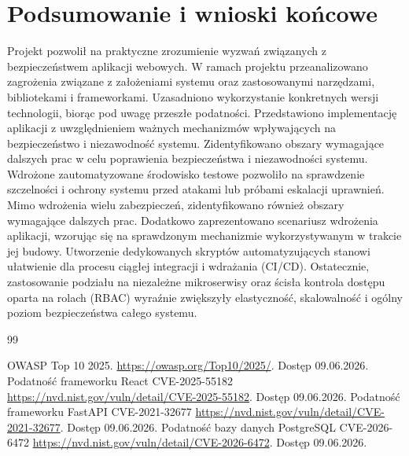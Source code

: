 \documentclass[12pt,twoside]{article}
\begin{document}
\section{Podsumowanie i wnioski końcowe}
Projekt pozwolił na praktyczne zrozumienie wyzwań związanych z bezpieczeństwem aplikacji webowych. W ramach projektu przeanalizowano zagrożenia związane z założeniami systemu oraz zastosowanymi narzędzami, bibliotekami i frameworkami. Uzasadniono wykorzystanie konkretnych wersji technologii, biorąc pod uwagę przeszłe podatności. Przedstawiono implementację aplikacji z uwzględnieniem ważnych mechanizmów wpływających na bezpieczeństwo i niezawodność systemu. Zidentyfikowano obszary wymagające dalszych prac w celu poprawienia bezpieczeństwa i niezawodności systemu. Wdrożone zautomatyzowane środowisko testowe pozwoliło na sprawdzenie szczelności i ochrony systemu przed atakami lub próbami eskalacji uprawnień. Mimo wdrożenia wielu zabezpieczeń, zidentyfikowano również obszary wymagające dalszych prac.
Dodatkowo zaprezentowano scenariusz wdrożenia aplikacji, wzorując się na sprawdzonym mechanizmie wykorzystywanym w trakcie jej budowy. Utworzenie dedykowanych skryptów automatyzujących stanowi ułatwienie dla procesu ciągłej integracji i wdrażania (CI/CD). Ostatecznie, zastosowanie podziału na niezależne mikroserwisy oraz ścisła kontrola dostępu oparta na rolach (RBAC) wyraźnie zwiększyły elastyczność, skalowalność i ogólny poziom bezpieczeństwa całego systemu.

\clearpage

\begin{thebibliography}{99}

OWASP Top 10 2025. \url{https://owasp.org/Top10/2025/}. Dostęp 09.06.2026.
Podatność frameworku React CVE-2025-55182 \url{https://nvd.nist.gov/vuln/detail/CVE-2025-55182}. Dostęp 09.06.2026.
Podatność frameworku FastAPI CVE-2021-32677 \url{https://nvd.nist.gov/vuln/detail/CVE-2021-32677}. Dostęp 09.06.2026.
Podatność bazy danych PostgreSQL CVE-2026-6472 \url{https://nvd.nist.gov/vuln/detail/CVE-2026-6472}. Dostęp 09.06.2026.

\end{thebibliography}

\clearpage
\end{document}
